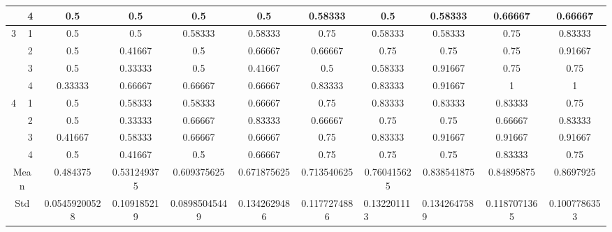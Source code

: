 \documentclass[draft,dvipsnames]{drexel-thesis}
\begin{document}
\begin{thesis}
\begin{table}[!t]
{\begin{tabular}{|c|c|c|c|c|c|c|c|c|c|c|}
                      & 4                   & 0.5           & 0.5         & 0.5           & 0.5          & 0.58333      & 0.5                              & 0.58333                           & 0.66667      & 0.66667      \\ \hline
\multirow{4}{*}{3}    & 1                   & 0.5           & 0.5         & 0.58333       & 0.58333      & 0.75         & 0.58333                          & 0.58333                           & 0.75         & 0.83333      \\ \cline{2-11}
                      & 2                   & 0.5           & 0.41667     & 0.5           & 0.66667      & 0.66667      & 0.75                             & 0.75                              & 0.75         & 0.91667      \\ \cline{2-11}
                      & 3                   & 0.5           & 0.33333     & 0.5           & 0.41667      & 0.5          & 0.58333                          & 0.91667                           & 0.75         & 0.75         \\ \cline{2-11}
                      & 4                   & 0.33333       & 0.66667     & 0.66667       & 0.66667      & 0.83333      & 0.83333                          & 0.91667                           & 1            & 1            \\ \hline
\multirow{4}{*}{4}    & 1                   & 0.5           & 0.58333     & 0.58333       & 0.66667      & 0.75         & 0.83333                          & 0.83333                           & 0.83333      & 0.75         \\ \cline{2-11}
                      & 2                   & 0.5           & 0.33333     & 0.66667       & 0.83333      & 0.66667      & 0.75                             & 0.75                              & 0.66667      & 0.83333      \\ \cline{2-11}
                      & 3                   & 0.41667       & 0.58333     & 0.66667       & 0.66667      & 0.75         & 0.83333                          & 0.91667                           & 0.91667      & 0.91667      \\ \cline{2-11}
                      & 4                   & 0.5           & 0.41667     & 0.5           & 0.66667      & 0.75         & 0.75                             & 0.75                              & 0.83333      & 0.75         \\ \hline
\multicolumn{2}{|c|}{Mean}                  & 0.484375      & 0.531249375 & 0.609375625   & 0.671875625  & 0.713540625  & 0.760415625                      & 0.838541875                       & 0.84895875   & 0.8697925    \\ \hline
\multicolumn{2}{|c|}{Std}                   & 0.05459200528 & 0.109185219 & 0.08985045449 & 0.1342629486 & 0.1177274886 & \multicolumn{1}{l|}{0.132201113} & \multicolumn{1}{l|}{0.1342647589} & 0.1187071365 & 0.1007786353 \\ \hline
\end{tabular}}
\end{table}


\end{thesis}
\end{document}
